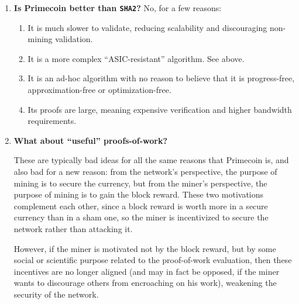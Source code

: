 \documentclass[letterpaper]{article}
\theoremstyle{xxx}
\theoremstyle{evil}
\theoremstyle{yyy}
\theoremstyle{plain}
\theoremstyle{zzz}
\begin{document}
\begin{enumerate}
\item \textbf{Is Primecoin better than \texttt{SHA2}?}
No, for a few reasons:
\begin{enumerate}
\item It is much slower to validate, reducing scalability and discouraging
non-mining validation.
\item It is a more complex ``ASIC-resistant'' algorithm. See above.
\item It is an ad-hoc algorithm with no reason to believe that it is progress-free,
approximation-free or optimization-free.
\item Its proofs are large, meaning expensive verification and higher bandwidth
requirements.
\end{enumerate}

\item \textbf{What about ``useful'' proofs-of-work?}

These are typically bad ideas for all the same reasons that Primecoin is,
and also bad for a new reason: from the network's perspective, the purpose
of mining is to secure the currency, but from the miner's perspective, the
purpose of mining is to gain the block reward. These two motivations
complement each other, since a block reward is worth more in a secure
currency than in a sham one, so the miner is incentivized to secure the
network rather than attacking it.

However, if the miner is motivated not by the block reward, but by some
social or scientific purpose related to the proof-of-work evaluation,
then these incentives are no longer aligned (and may in fact be opposed,
if the miner wants to discourage others from encroaching on his work),
weakening the security of the network.

\end{enumerate}
\end{document}
